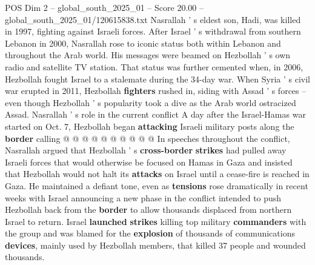 \begin{textsample}{POS Dim 2 – global\_south\_2025\_01 – Score 20.00 – global\_south\_2025\_01/120615838.txt}
Nasrallah ' s eldest son, Hadi, was killed in 1997, fighting against Israeli forces.
After Israel ' s withdrawal from southern Lebanon in 2000, Nasrallah rose to iconic status both within Lebanon and throughout the Arab world.
His messages were beamed on Hezbollah ' s own radio and satellite TV station.
That status was further cemented when, in 2006, Hezbollah fought Israel to a stalemate during the 34-day war.
When Syria ' s civil war erupted in 2011, Hezbollah \textbf{fighters} rushed in, siding with Assad ' s forces -- even though Hezbollah ' s popularity took a dive as the Arab world ostracized Assad.
Nasrallah ' s role in the current conflict A day after the Israel-Hamas war started on Oct. 7, Hezbollah began \textbf{attacking} Israeli military posts along the \textbf{border} calling @ @ @ @ @ @ @ @ @ @ In speeches throughout the conflict, Nasrallah argued that Hezbollah ' s \textbf{cross-border} \textbf{strikes} had pulled away Israeli forces that would otherwise be focused on Hamas in Gaza and insisted that Hezbollah would not halt its \textbf{attacks} on Israel until a cease-fire is reached in Gaza.
He maintained a defiant tone, even as \textbf{tensions} rose dramatically in recent weeks with Israel announcing a new phase in the conflict intended to push Hezbollah back from the \textbf{border} to allow thousands displaced from northern Israel to return.
Israel \textbf{launched} \textbf{strikes} killing top military \textbf{commanders} with the group and was blamed for the \textbf{explosion} of thousands of communications \textbf{devices}, mainly used by Hezbollah members, that killed 37 people and wounded thousands.

\end{textsample}
